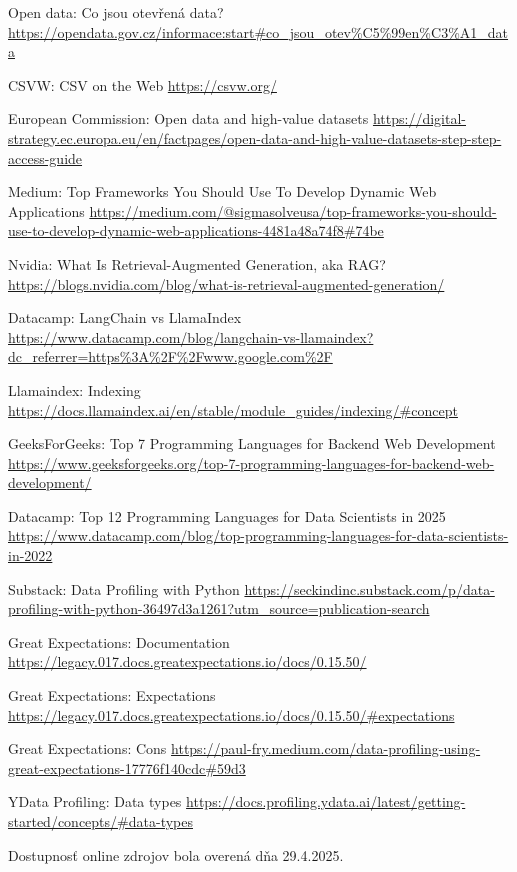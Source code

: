 \begin{thebibliography}{99}


Open data: Co jsou otevřená data?
\url{https://opendata.gov.cz/informace:start#co_jsou_otev\%C5\%99en\%C3\%A1_data}

 CSVW: CSV on the Web \url{https://csvw.org/}

European Commission: Open data and high-value datasets
\url{https://digital-strategy.ec.europa.eu/en/factpages/open-data-and-high-value-datasets-step-step-access-guide}

Medium: Top Frameworks You Should Use To Develop Dynamic Web Applications
\url{https://medium.com/@sigmasolveusa/top-frameworks-you-should-use-to-develop-dynamic-web-applications-4481a48a74f8#74be}

Nvidia: What Is Retrieval-Augmented Generation, aka RAG?
\url{https://blogs.nvidia.com/blog/what-is-retrieval-augmented-generation/}

Datacamp: LangChain vs LlamaIndex
\url{https://www.datacamp.com/blog/langchain-vs-llamaindex?dc_referrer=https\%3A\%2F\%2Fwww.google.com\%2F}

Llamaindex: Indexing
\url{https://docs.llamaindex.ai/en/stable/module_guides/indexing/\#concept}

GeeksForGeeks: Top 7 Programming Languages for Backend Web Development
\url{https://www.geeksforgeeks.org/top-7-programming-languages-for-backend-web-development/}

Datacamp: Top 12 Programming Languages for Data Scientists in 2025
\url{https://www.datacamp.com/blog/top-programming-languages-for-data-scientists-in-2022}

Substack: Data Profiling with Python
\url{https://seckindinc.substack.com/p/data-profiling-with-python-36497d3a1261?utm_source=publication-search}

Great Expectations: Documentation
\url{https://legacy.017.docs.greatexpectations.io/docs/0.15.50/}

Great Expectations: Expectations
\url{https://legacy.017.docs.greatexpectations.io/docs/0.15.50/#expectations}

Great Expectations: Cons
\url{https://paul-fry.medium.com/data-profiling-using-great-expectations-17776f140cdc#59d3}

YData Profiling: Data types
\url{https://docs.profiling.ydata.ai/latest/getting-started/concepts/#data-types}

\end{thebibliography}

Dostupnosť online zdrojov bola overená dňa 29.4.2025.
